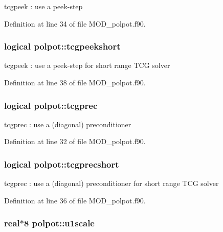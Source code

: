 tcgpeek \-: use a peek-\/step 



Definition at line 34 of file M\-O\-D\-\_\-polpot.\-f90.

\hypertarget{classpolpot_a73af9eaecbba722071b6c0041d2ba4f5}{
\subsubsection[{tcgpeekshort}]{\setlength{\rightskip}{0pt plus 5cm}logical polpot\-::tcgpeekshort}}\label{classpolpot_a73af9eaecbba722071b6c0041d2ba4f5}


tcgpeek \-: use a peek-\/step for short range T\-C\-G solver 



Definition at line 38 of file M\-O\-D\-\_\-polpot.\-f90.

\hypertarget{classpolpot_aa152fca51bc59dec7f07c1c7a19b1e00}{
\subsubsection[{tcgprec}]{\setlength{\rightskip}{0pt plus 5cm}logical polpot\-::tcgprec}}\label{classpolpot_aa152fca51bc59dec7f07c1c7a19b1e00}


tcgprec \-: use a (diagonal) preconditioner 



Definition at line 32 of file M\-O\-D\-\_\-polpot.\-f90.

\hypertarget{classpolpot_a4edaa232655246d6e72f41f4be85b606}{
\subsubsection[{tcgprecshort}]{\setlength{\rightskip}{0pt plus 5cm}logical polpot\-::tcgprecshort}}\label{classpolpot_a4edaa232655246d6e72f41f4be85b606}


tcgprec \-: use a (diagonal) preconditioner for short range T\-C\-G solver 



Definition at line 36 of file M\-O\-D\-\_\-polpot.\-f90.

\hypertarget{classpolpot_a6ad8c7d8432e1c8dacacec8be9664184}{
\subsubsection[{u1scale}]{\setlength{\rightskip}{0pt plus 5cm}real$\ast$8 polpot\-::u1scale}}\label{classpolpot_a6ad8c7d8432e1c8dacacec8be9664184}


